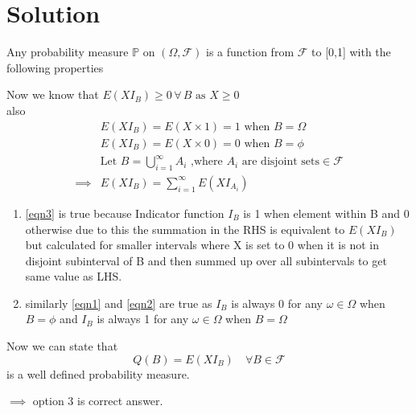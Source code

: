 \documentclass[journal,12pt,twocolumn]{IEEEtran}
\begin{document}
\section{Solution}
Any probability measure \(\mathbb{P}\) on \((\Omega,\mathcal{F})\) is a function from \(\mathcal{F}\) to [0,1] with the following properties
Now we know that \(E(XI_B)\geq 0\, \forall\, B\text{ as } X\geq 0\)\\
also 
\begin{align}
& E(XI_B)=E(X\times 1)=1  \text{ when } B=\Omega \label{eqn1}\\ 
& E(XI_B)=E(X\times0)=0  \text{ when } B=\phi  \label{eqn2} \\ \nonumber
& \text{Let } B=\bigcup_{i=1}^{\infty} A_i \text{ ,where } A_i\text{ are disjoint sets}\in \mathcal{F}\\ 
\implies & E(XI_B)=\sum_{i=1}^{\infty} E(XI_{A_i}) \label{eqn3}
\end{align}
\begin{enumerate}
\item \eqref{eqn3} is true because Indicator function \(I_B\) is 1 when element within B and 0 otherwise due to this the summation in the RHS is equivalent to \( E(XI_B)\) but calculated for smaller intervals where X is set to 0 when it is not in disjoint subinterval of B and then summed up over all subintervals to get same value as LHS.
\item similarly \eqref{eqn1} and \eqref{eqn2} are true as \(I_B\) is always 0 for any \(\omega \in \Omega\) when \(B=\phi\) and \(I_B\) is always 1 for any \(\omega \in \Omega\) when \(B =\Omega\)
\end{enumerate} 
Now we can state that \[Q(B)=E(XI_B)\quad\forall B \in \mathcal{F}\] is a well defined probability measure.

\(\implies\) option 3 is correct answer.
\end{document}
